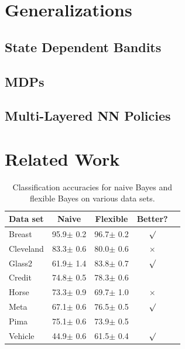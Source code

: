 \section{Generalizations}

\subsection{State Dependent Bandits}

\subsection{MDPs}

\subsection{Multi-Layered NN Policies}

\section{Related Work}




\nocite{langley00}
\fi

\begin{table}[t]
\caption{Classification accuracies for naive Bayes and flexible
Bayes on various data sets.}
\label{sample-table}
\vskip 0.15in
\begin{center}
\begin{small}
\begin{sc}
\begin{tabular}{lcccr}
\toprule
Data set & Naive & Flexible & Better? \\
\midrule
Breast    & 95.9$\pm$ 0.2& 96.7$\pm$ 0.2& $\surd$ \\
Cleveland & 83.3$\pm$ 0.6& 80.0$\pm$ 0.6& $\times$\\
Glass2    & 61.9$\pm$ 1.4& 83.8$\pm$ 0.7& $\surd$ \\
Credit    & 74.8$\pm$ 0.5& 78.3$\pm$ 0.6&         \\
Horse     & 73.3$\pm$ 0.9& 69.7$\pm$ 1.0& $\times$\\
Meta      & 67.1$\pm$ 0.6& 76.5$\pm$ 0.5& $\surd$ \\
Pima      & 75.1$\pm$ 0.6& 73.9$\pm$ 0.5&         \\
Vehicle   & 44.9$\pm$ 0.6& 61.5$\pm$ 0.4& $\surd$ \\
\bottomrule
\end{tabular}
\end{sc}
\end{small}
\end{center}
\vskip -0.1in
\end{table}
\fi

